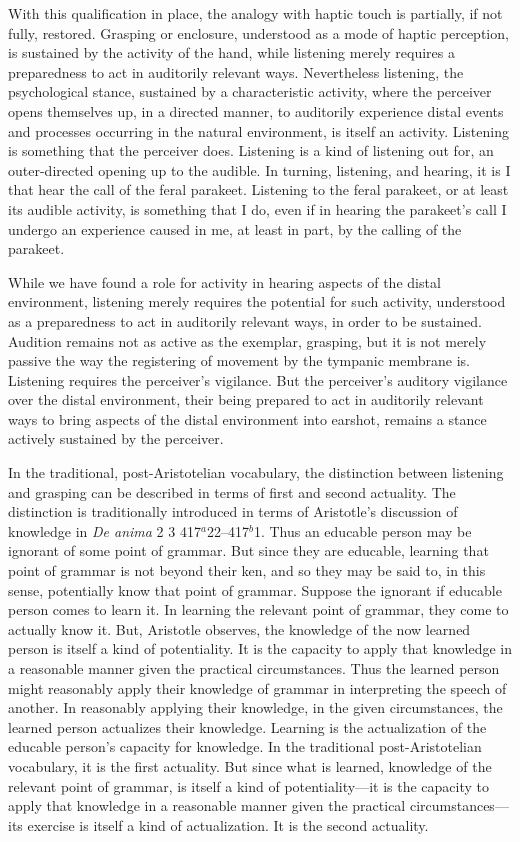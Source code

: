 With this qualification in place, the analogy with haptic touch is partially, if not fully, restored. Grasping or enclosure, understood as a mode of haptic perception, is sustained by the activity of the hand, while listening merely requires a preparedness to act in auditorily relevant ways. Nevertheless listening, the psychological stance, sustained by a characteristic activity, where the perceiver opens themselves up, in a directed manner, to auditorily experience distal events and processes occurring in the natural environment, is itself an activity. Listening is something that the perceiver does. Listening is a kind of listening out for, an outer-directed opening up to the audible. In turning, listening, and hearing, it is I that hear the call of the feral parakeet. Listening to the feral parakeet, or at least its audible activity, is something that I do, even if in hearing the parakeet's call I undergo an experience caused in me, at least in part, by the calling of the parakeet.

While we have found a role for activity in hearing aspects of the distal environment, listening merely requires the potential for such activity, understood as a preparedness to act in auditorily relevant ways, in order to be sustained. Audition remains not as active as the exemplar, grasping, but it is not merely passive the way the registering of movement by the tympanic membrane is. Listening requires the perceiver's vigilance. But the perceiver's auditory vigilance over the distal environment, their being prepared to act in auditorily relevant ways to bring aspects of the distal environment into earshot, remains a stance actively sustained by the perceiver.

In the traditional, post-Aristotelian vocabulary, the distinction between listening and grasping can be described in terms of first and second actuality. The distinction is traditionally introduced in terms of Aristotle's discussion of knowledge in \emph{De anima} 2 3 417\( ^{a} \)22--417\( ^{b} \)1. Thus an educable person may be ignorant of some point of grammar. But since they are educable, learning that point of grammar is not beyond their ken, and so they may be said to, in this sense, potentially know that point of grammar. Suppose the ignorant if educable person comes to learn it. In learning the relevant point of grammar, they come to actually know it. But, Aristotle observes, the knowledge of the now learned person is itself a kind of potentiality. It is the capacity to apply that knowledge in a reasonable manner given the practical circumstances. Thus the learned person might reasonably apply their knowledge of grammar in interpreting the speech of another. In reasonably applying their knowledge, in the given circumstances, the learned person actualizes their knowledge. Learning is the actualization of the educable person's capacity for knowledge. In the traditional post-Aristotelian vocabulary, it is the first actuality. But since what is learned, knowledge of the relevant point of grammar, is itself a kind of potentiality---it is the capacity to apply that knowledge in a reasonable manner given the practical circumstances---its exercise is itself a kind of actualization. It is the second actuality. 

